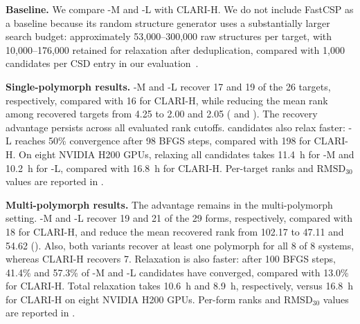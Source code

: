 \textbf{Baseline.}
We compare \model{}-M and \model{}-L with CLARI-H. We do not include FastCSP as
a baseline because its random structure generator uses a
substantially larger search budget: approximately 53{,}000--300{,}000 raw
structures per target, with 10{,}000--176{,}000 retained for relaxation after
deduplication, compared with 1{,}000 candidates per CSD entry in our
evaluation~\citep{gharakhanyan2025fastcsp}.

\textbf{Single-polymorph results.}
\model{}-M and \model{}-L recover 17 and 19 of the 26 targets, respectively,
compared with 16 for CLARI-H, while reducing the mean rank among recovered
targets from 4.25 to 2.00 and 2.05 ( and ). The recovery advantage persists across all evaluated rank cutoffs. \model{} candidates also relax faster: \model{}-L reaches 50\% convergence after 98 BFGS steps, compared with 198 for CLARI-H. On eight NVIDIA H200 GPUs, relaxing all candidates takes
11.4~h for \model{}-M and 10.2~h for \model{}-L, compared with 16.8~h for CLARI-H. Per-target ranks and $\mathrm{RMSD}_{30}$ values are reported in .





\textbf{Multi-polymorph results.}
The advantage remains in the multi-polymorph setting. \model{}-M and \model{}-L
recover 19 and 21 of the 29 forms, respectively, compared with 18 for CLARI-H,
and reduce the mean recovered rank from 102.17 to 47.11 and 54.62
(). Also,
both \model{} variants recover at least one polymorph for all 8 of 8 systems,
whereas CLARI-H recovers 7. Relaxation is also faster: after 100 BFGS steps,
41.4\% and 57.3\% of \model{}-M and \model{}-L candidates have converged,
compared with 13.0\% for CLARI-H. Total relaxation takes 10.6~h and 8.9~h,
respectively, versus 16.8~h for CLARI-H on eight NVIDIA H200 GPUs. Per-form
ranks and $\mathrm{RMSD}_{30}$ values are reported in
.




